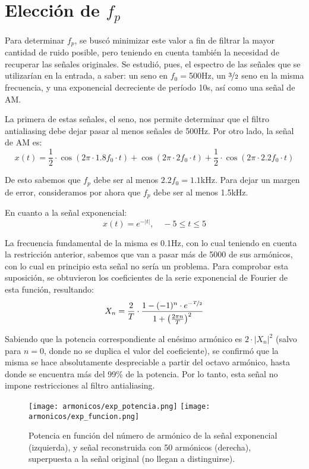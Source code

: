 \documentclass{article}
\begin{document}
\section{Elecci\'on de $f_p$}

Para determinar $f_p$, se busc\'o minimizar este valor a fin de filtrar la mayor cantidad de ruido posible, pero teniendo en cuenta tambi\'en la necesidad de recuperar las se\~nales originales. Se estudió, pues, el espectro de las señales que se utilizarían en la entrada, a saber: un seno en $f_0=$500Hz, un $\nicefrac{3}{2}$ seno en la misma frecuencia, y una exponencial decreciente de per\'iodo 10s, as\'i como una se\~nal de AM. \par 

La primera de estas se\~nales, el seno, nos permite determinar que el filtro antialiasing debe dejar pasar al menos se\~nales de 500Hz. Por otro lado, la se\~nal de AM es:
\[ x(t) = \frac{1}{2} \cdot \cos{\left(2\pi\cdot 1.8f_0 \cdot t\right)} + \cos{\left(2\pi\cdot 2f_0 \cdot t\right)} +\frac{1}{2} \cdot \cos{\left(2\pi\cdot 2.2f_0 \cdot t\right)} \]

De esto sabemos que $f_p$ debe ser al menos $2.2f_0=1.1$kHz. Para dejar un margen de error, consideramos por ahora que $f_p$ debe ser al menos 1.5kHz.

En cuanto a la se\~nal exponencial:
\[ x(t) = e^{-|t|}, \quad -5 \leq t \leq 5 \]

La frecuencia fundamental de la misma es 0.1Hz, con lo cual teniendo en cuenta la restricci\'on anterior, sabemos que van a pasar m\'as de 5000 de sus arm\'onicos, con lo cual en principio esta se\~nal no ser\'ia un problema. Para comprobar esta suposici\'on, se obtuvieron los coeficientes de la serie exponencial de Fourier de esta funci\'on, resultando:
\[ X_n = \frac{2}{T} \cdot \frac{1 - (-1)^n \cdot e^{-\nicefrac{T}{2}}}{1 + \left(\frac{2\pi n}{T}\right)^2} \]

Sabiendo que la potencia correspondiente al en\'esimo arm\'onico es $2 \cdot |X_n|^2$ (salvo para $n=0$, donde no se duplica el valor del coeficiente), se confirm\'o que la misma se hace absolutamente despreciable a partir del octavo arm\'onico, hasta donde se encuentra m\'as del 99\% de la potencia. Por lo tanto, esta se\~nal no impone restricciones al filtro antialiasing.

\begin{figure}[htb]     
	\centering     
	\texttt{[image: armonicos/exp\_potencia.png]}     
	\texttt{[image: armonicos/exp\_funcion.png]}     
	\caption{Potencia en funci\'on del n\'umero de arm\'onico de la se\~nal exponencial (izquierda), y se\~nal reconstruida con 50 arm\'onicos (derecha), superpuesta a la se\~nal original (no llegan a distinguirse).}     
	\label{fig:armonicos_exp} 
\end{figure}
\end{document}
